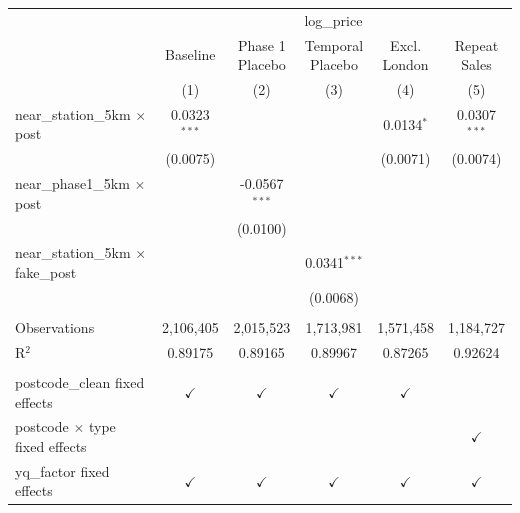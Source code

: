    \begin{tabular}{lccccc}
      \toprule
       & \multicolumn{5}{c}{log\_price}\\
                                                 & Baseline       & \makecell{Phase 1\\Placebo}    & \makecell{Temporal\\Placebo}    & \makecell{Excl.\\London}    & \makecell{Repeat\\Sales} \\      
                                                 & (1)            & (2)                            & (3)                             & (4)                         & (5)\\  
      \midrule 
      near\_station\_5km $\times$ post           & 0.0323$^{***}$ &                                &                                 & 0.0134$^{*}$                & 0.0307$^{***}$\\   
                                                 & (0.0075)       &                                &                                 & (0.0071)                    & (0.0074)\\   
      near\_phase1\_5km $\times$ post            &                & -0.0567$^{***}$                &                                 &                             &   \\   
                                                 &                & (0.0100)                       &                                 &                             &   \\   
      near\_station\_5km $\times$ fake\_post     &                &                                & 0.0341$^{***}$                  &                             &   \\   
                                                 &                &                                & (0.0068)                        &                             &   \\   
       \\
      Observations                               & 2,106,405      & 2,015,523                      & 1,713,981                       & 1,571,458                   & 1,184,727\\  
      R$^2$                                      & 0.89175        & 0.89165                        & 0.89967                         & 0.87265                     & 0.92624\\  
       \\
      postcode\_clean fixed effects              & $\checkmark$   & $\checkmark$                   & $\checkmark$                    & $\checkmark$                & \\
      postcode $\times$ type fixed effects       &                &                                &                                 &                             & $\checkmark$\\
      yq\_factor fixed effects                   & $\checkmark$   & $\checkmark$                   & $\checkmark$                    & $\checkmark$                & $\checkmark$\\   
      \bottomrule
   \end{tabular}
